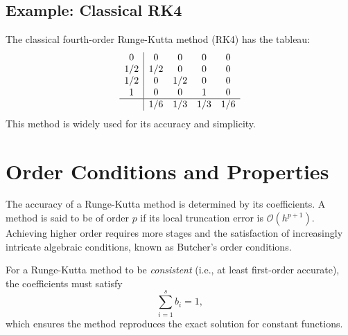 \subsection{Example: Classical RK4}
The classical fourth-order Runge-Kutta method (RK4) has the tableau:
\begin{equation*}
\begin{array}{c|cccc}
  0   & 0   & 0   & 0   & 0   \\
  1/2 & 1/2 & 0   & 0   & 0   \\
  1/2 & 0   & 1/2 & 0   & 0   \\
  1   & 0   & 0   & 1   & 0   \\
  \hline
      & 1/6 & 1/3 & 1/3 & 1/6
\end{array}
\end{equation*}
This method is widely used for its accuracy and simplicity.
\section{Order Conditions and Properties}
\label{sec:rk:order}
The accuracy of a Runge-Kutta method is determined by its coefficients. A method is said to be of order $p$ if its local truncation error is $\mathcal{O}(h^{p+1})$. Achieving higher order requires more stages and the satisfaction of increasingly intricate algebraic conditions, known as Butcher's order conditions.

For a Runge-Kutta method to be \emph{consistent} (i.e., at least first-order accurate), the coefficients must satisfy
\begin{equation}
  \sum_{i=1}^s b_i = 1,
\end{equation}
which ensures the method reproduces the exact solution for constant functions.

